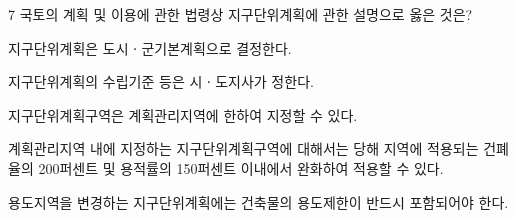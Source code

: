 \begin{question}{7}
국토의 계획 및 이용에 관한 법령상 지구단위계획에 관한 설명으로 옳은 것은?
\begin{choices}
  \item 지구단위계획은 도시ㆍ군기본계획으로 결정한다.
  \item 지구단위계획의 수립기준 등은 시ㆍ도지사가 정한다.
  \item 지구단위계획구역은 계획관리지역에 한하여 지정할 수 있다.
  \item 계획관리지역 내에 지정하는 지구단위계획구역에 대해서는 당해 지역에 적용되는 건폐율의 200퍼센트 및 용적률의 150퍼센트 이내에서 완화하여 적용할 수 있다.
  \item 용도지역을 변경하는 지구단위계획에는 건축물의 용도제한이 반드시 포함되어야 한다.
\end{choices}
\end{question}
